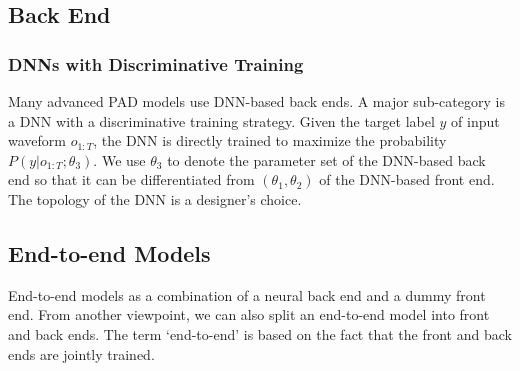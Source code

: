 \subsection{Back End}

\subsubsection{DNNs with Discriminative Training}

Many advanced PAD models use DNN-based back ends. A major sub-category is a \acs{DNN} with a discriminative training strategy. Given the target label \(y\) of input waveform  \(o_{1:T}\), the \acs{DNN} is directly trained to maximize the probability \(P(y|o_{1:T};\theta_{3})\). We use \(\theta_3\) to denote the parameter set of the DNN-based back end so that it can be differentiated from \((\theta_{1},\theta_{2})\) of the DNN-based front end. The topology of the DNN is a designer’s choice\cite{wang2022practical}.

\subsection{End-to-end Models}

End-to-end models as a combination of a neural back end and a dummy front end. From another viewpoint, we can also split an end-to-end model into front and back ends. The term ‘end-to-end’ is based on the fact that the front and back ends are jointly trained\cite{wang2022practical}.

\endinput

